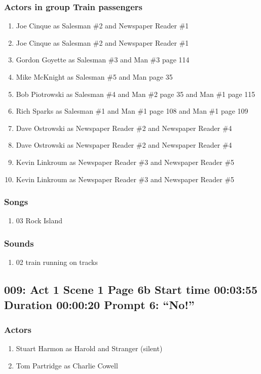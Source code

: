 \subsubsection{Actors in group Train passengers}
\begin{enumerate}
\item Joe Cinque as Salesman \#2 and Newspaper Reader \#1
\item Joe Cinque as Salesman \#2 and Newspaper Reader \#1
\item Gordon Goyette as Salesman \#3 and Man \#3 page 114
\item Mike McKnight as Salesman \#5 and Man page 35
\item Bob Piotrowski as Salesman \#4 and Man \#2 page 35 and Man \#1 page 115
\item Rich Sparks as Salesman \#1 and Man \#1 page 108 and Man \#1 page 109
\item Dave Ostrowski as Newspaper Reader \#2 and Newspaper Reader \#4
\item Dave Ostrowski as Newspaper Reader \#2 and Newspaper Reader \#4
\item Kevin Linkroum as Newspaper Reader \#3 and Newspaper Reader \#5
\item Kevin Linkroum as Newspaper Reader \#3 and Newspaper Reader \#5
\end{enumerate}

\subsubsection{Songs}
\begin{enumerate}
\item 03 Rock Island
\end{enumerate}\subsubsection{Sounds}
\begin{enumerate}
\item 02 train running on tracks
\end{enumerate}
\subsection{009: Act 1 Scene 1 Page 6b Start time 00:03:55 Duration 00:00:20 Prompt 6: ``No!''}

\subsubsection{Actors}
\begin{enumerate}
\item Stuart Harmon as Harold and Stranger (silent)
\item Tom Partridge as Charlie Cowell
\end{enumerate}
